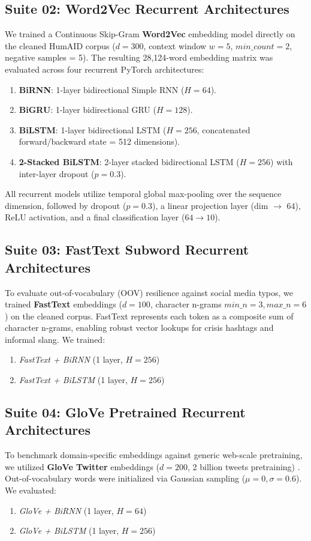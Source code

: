 \documentclass[12pt,a4paper]{article}
\begin{document}
\subsection{Suite 02: Word2Vec Recurrent Architectures}
We trained a Continuous Skip-Gram \textbf{Word2Vec} embedding model directly on the cleaned HumAID corpus ($d = 300$, context window $w = 5$, $min\_count = 2$, negative samples = 5). The resulting 28,124-word embedding matrix was evaluated across four recurrent PyTorch architectures:
\begin{enumerate}
    \item \textbf{BiRNN}: 1-layer bidirectional Simple RNN ($H = 64$).
    \item \textbf{BiGRU}: 1-layer bidirectional GRU ($H = 128$).
    \item \textbf{BiLSTM}: 1-layer bidirectional LSTM ($H = 256$, concatenated forward/backward state = 512 dimensions).
    \item \textbf{2-Stacked BiLSTM}: 2-layer stacked bidirectional LSTM ($H = 256$) with inter-layer dropout ($p = 0.3$).
\end{enumerate}
All recurrent models utilize temporal global max-pooling over the sequence dimension, followed by dropout ($p = 0.3$), a linear projection layer (dim $\rightarrow$ 64), ReLU activation, and a final classification layer ($64 \rightarrow 10$).

\subsection{Suite 03: FastText Subword Recurrent Architectures}
To evaluate out-of-vocabulary (OOV) resilience against social media typos, we trained \textbf{FastText} embeddings ($d = 100$, character n-grams $min\_n = 3, max\_n = 6$) on the cleaned corpus. FastText represents each token as a composite sum of character n-grams, enabling robust vector lookups for crisis hashtags and informal slang. We trained:
\begin{enumerate}
    \item \textit{FastText + BiRNN} (1 layer, $H = 256$)
    \item \textit{FastText + BiLSTM} (1 layer, $H = 256$)
\end{enumerate}

\subsection{Suite 04: GloVe Pretrained Recurrent Architectures}
To benchmark domain-specific embeddings against generic web-scale pretraining, we utilized \textbf{GloVe Twitter} embeddings ($d = 200$, 2 billion tweets pretraining) \cite{pennington2014glove}. Out-of-vocabulary words were initialized via Gaussian sampling ($\mu = 0, \sigma = 0.6$). We evaluated:
\begin{enumerate}
    \item \textit{GloVe + BiRNN} (1 layer, $H = 64$)
    \item \textit{GloVe + BiLSTM} (1 layer, $H = 256$)
\end{enumerate}
\end{document}
